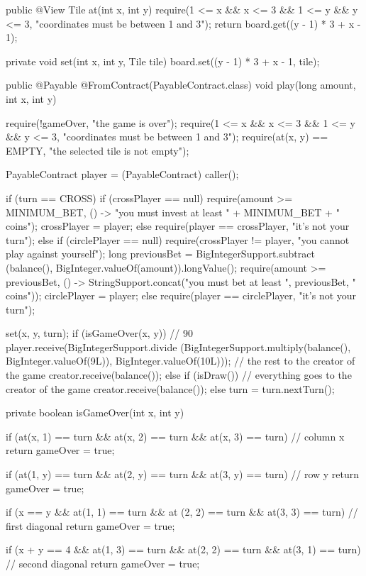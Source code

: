 \begin{codebox}
\begin{javalst}
{  public @View Tile at(int x, int y) {
    require(1 <= x && x <= 3 && 1 <= y && y <= 3, "coordinates must be between 1 and 3");
    return board.get((y - 1) * 3 + x - 1);
  }

  private void set(int x, int y, Tile tile) {
    board.set((y - 1) * 3 + x - 1, tile);
  }

  public @Payable @FromContract(PayableContract.class) void play(long amount, int x, int y) {
    require(!gameOver, "the game is over");
    require(1 <= x && x <= 3 && 1 <= y && y <= 3, "coordinates must be between 1 and 3");
    require(at(x, y) == EMPTY, "the selected tile is not empty");

    PayableContract player = (PayableContract) caller();

    if (turn == CROSS)
      if (crossPlayer == null) {
        require(amount >= MINIMUM_BET, () -> "you must invest at least " + MINIMUM_BET + " coins");
         crossPlayer = player;
      }
      else
        require(player == crossPlayer, "it's not your turn");
    else
      if (circlePlayer == null) {
        require(crossPlayer != player, "you cannot play against yourself");
        long previousBet = BigIntegerSupport.subtract
          (balance(), BigInteger.valueOf(amount)).longValue();
        require(amount >= previousBet,
          () -> StringSupport.concat("you must bet at least ", previousBet, " coins"));
        circlePlayer = player;
      }
      else
        require(player == circlePlayer, "it's not your turn");

    set(x, y, turn);
    if (isGameOver(x, y)) {
      // 90%
      player.receive(BigIntegerSupport.divide
        (BigIntegerSupport.multiply(balance(), BigInteger.valueOf(9L)), BigInteger.valueOf(10L)));
      // the rest to the creator of the game
      creator.receive(balance());
    }
    else if (isDraw())
      // everything goes to the creator of the game
      creator.receive(balance());
    else
      turn = turn.nextTurn();
  }

  private boolean isGameOver(int x, int y) {
    if (at(x, 1) == turn && at(x, 2) == turn && at(x, 3) == turn) // column x
      return gameOver = true;

    if (at(1, y) == turn && at(2, y) == turn && at(3, y) == turn) // row y
      return gameOver = true;

    if (x == y && at(1, 1) == turn && at (2, 2) == turn && at(3, 3) == turn) // first diagonal
      return gameOver = true;

    if (x + y == 4 && at(1, 3) == turn && at(2, 2) == turn && at(3, 1) == turn) // second diagonal
      return gameOver = true;

}}
\end{javalst}
\end{codebox}
